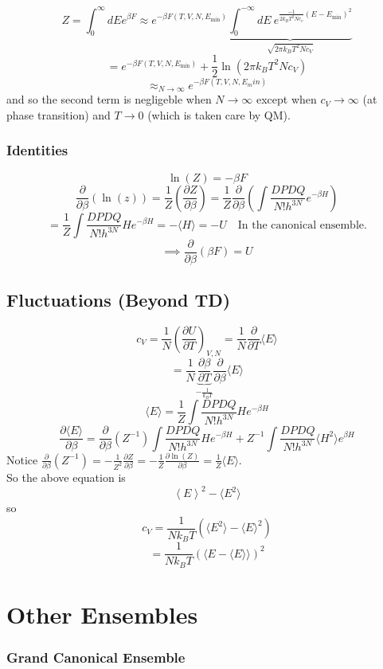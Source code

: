 \documentclass[11pt]{book}
\theoremstyle{definition}
\begin{document}
\[Z = \int_0^{\infty} dE e^{\beta F} \approx e^{-\beta F(T,V,N,E_{\min})} 
\underbrace{\int_0^{-\infty} dE \: e^{\frac{-1}{2k_BT^2Nc_v}(E-E_{\min})^2}}_{\sqrt{2\pi k_BT^2Nc_V}} \]
\[ = e^{-\beta F(T,V,N,E_{\min})}+ \frac{1}{2} \ln(2 \pi k_BT^2Nc_V ) \] 
\[ \approx_{N \to \infty} e^{-\beta F(T,V,N,E_min)} \] 
and so the second term is negligeble when $ N \to \infty $ except when $ c_V \to \infty $ (at phase transition) and $ T \to 0$ (which is taken care by QM).
\subsubsection{Identities}
\[ \ln(Z) = -\beta F  \] 
\[ \frac{\partial }{\partial \beta} (\ln(z)) = \frac{1}{Z}\left( \frac{\partial Z}{\partial \beta} \right) = \frac{1}{Z}\frac{\partial }{\partial \beta} \left( \int \frac{DPDQ}{N!h^{3N}} e^{-\beta H} \right)   \] 
\[ = \frac{1}{Z} \int \frac{DPDQ}{N!h^{3N}} He^{-\beta H} = - \langle H\rangle = -U \quad \text{In the canonical ensemble.} \] 
\[ \implies \frac{\partial }{\partial \beta}  (\beta F) = U\] 

\subsection{Fluctuations (Beyond TD)}
\[ c_V  = \frac{1}{N} \left( \frac{\partial U}{\partial T} \right)_{V,N} = \frac{1}{N} \frac{\partial }{\partial T} \langle E \rangle \] 
\[ = \frac{1}{N} 
\underbrace{\frac{\partial \beta}{\partial T}}_{-\frac{1}{k_BT}}
\frac{\partial }{\partial \beta} \langle E \rangle \] 
\[ \langle E \rangle = \frac{1}{Z} \int \frac{DPDQ}{N!h^{3N}} He^{-\beta H}  \] 
\[ \frac{\partial \langle E\rangle}{\partial \beta} = \frac{\partial }{\partial \beta} (Z^{-1}) \int \frac{DPDQ}{N!h^{3N}}He^{-\beta H} + Z^{-1} \int \frac{DPDQ}{N!h^{3N}} \langle H^2\rangle e^{\beta H}  \] 
Notice $ \frac{\partial }{\partial \beta}(Z^{-1}) = -\frac{1}{Z^2}\frac{\partial Z}{\partial \beta} = - \frac{1}{Z}\frac{\partial \ln(Z) }{\partial \beta} = \frac{1}{Z}\langle E \rangle $. \\
So the above equation is
\[ \left \langle E \right \rangle ^2 - \langle E^2 \rangle \] 
so
\[ c_V =  \frac{1}{Nk_BT} \left( \langle E^2 \rangle - \langle E \rangle^2 \right) \] 
\[ = \frac{1}{Nk_BT} \left( \langle E - \langle E \rangle\rangle \right)^2   \] 
\section{Other Ensembles}
\subsubsection{Grand Canonical Ensemble}%
\end{document}
